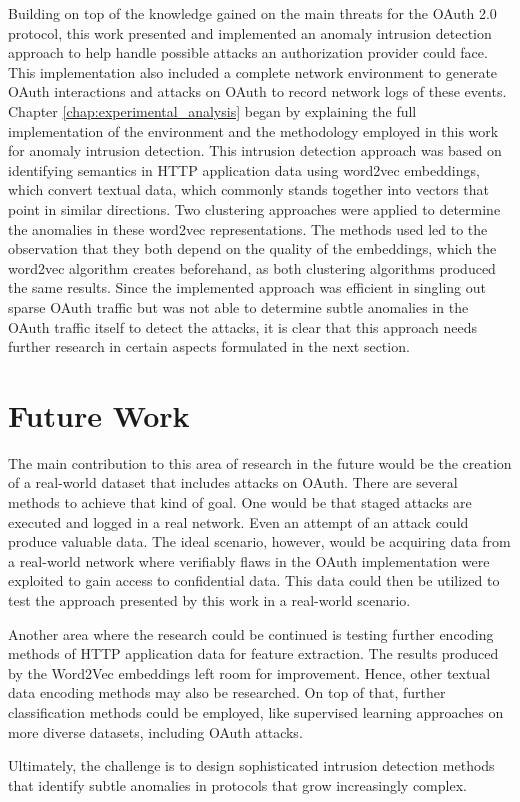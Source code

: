 Building on top of the knowledge gained on the main threats for the OAuth 2.0 protocol, this work presented and implemented an anomaly intrusion detection approach to help handle possible attacks an authorization provider could face. This implementation also included a complete network environment to generate OAuth interactions and attacks on OAuth to record network logs of these events. Chapter \ref{chap:experimental_analysis} began by explaining the full implementation of the environment and the methodology employed in this work for anomaly intrusion detection.
This intrusion detection approach was based on identifying semantics in HTTP application data using word2vec embeddings, which convert textual data, which commonly stands together into vectors that point in similar directions. Two clustering approaches were applied to determine the anomalies in these word2vec representations. The methods used led to the observation that they both depend on the quality of the embeddings, which the word2vec algorithm creates beforehand, as both clustering algorithms produced the same results. Since the implemented approach was efficient in singling out sparse OAuth traffic but was not able to determine subtle anomalies in the OAuth traffic itself to detect the attacks, it is clear that this approach needs further research in certain aspects formulated in the next section.

\section{Future Work}
\label{sec:future_work}

The main contribution to this area of research in the future would be the creation of a real-world dataset that includes attacks on OAuth. There are several methods to achieve that kind of goal. One would be that staged attacks are executed and logged in a real network. Even an attempt of an attack could produce valuable data. The ideal scenario, however, would be acquiring data from a real-world network where verifiably flaws in the OAuth implementation were exploited to gain access to confidential data. This data could then be utilized to test the approach presented by this work in a real-world scenario.

Another area where the research could be continued is testing further encoding methods of HTTP application data for feature extraction. The results produced by the Word2Vec embeddings left room for improvement. Hence, other textual data encoding methods may also be researched. On top of that, further classification methods could be employed, like supervised learning approaches on more diverse datasets, including OAuth attacks.

Ultimately, the challenge is to design sophisticated intrusion detection methods that identify subtle anomalies in protocols that grow increasingly complex.